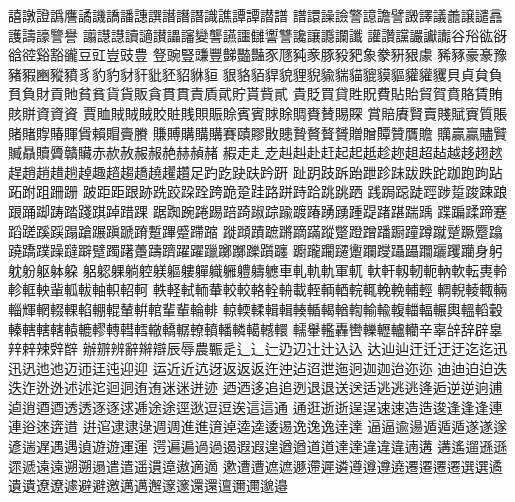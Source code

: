 譆󠄀譈󠄀證󠄀譌󠄀譍󠄀譎󠄀譏󠄀譑󠄀譒󠄀譓󠄀譔󠄀譖󠄀譖󠄁譖󠄂識󠄀譙󠄀譚󠄀譚󠄁譛󠄀譜󠄀
譜󠄁譞󠄀譟󠄀譣󠄀警󠄀譩󠄀譫󠄀譬󠄀譭󠄀譯󠄀議󠄀譱󠄀譲󠄀譴󠄀譶󠄀護󠄀譸󠄀譹󠄀譼󠄀譽󠄀
譾󠄀譿󠄀譿󠄁讀󠄀讁󠄀讃󠄀讄󠄀讅󠄀變󠄀讋󠄀讌󠄀讍󠄀讎󠄀讏󠄀讐󠄀讒󠄀讓󠄀讔󠄀讕󠄀讖󠄀
讙󠄀讚󠄀讜󠄀讝󠄀讞󠄀讟󠄀谷󠄀谸󠄀谹󠄀谺󠄀谽󠄀谾󠄀谿󠄀豁󠄀豅󠄀豆󠄀豇󠄀豈󠄀豉󠄀豊󠄀
豋󠄀豌󠄀豎󠄀豏󠄀豐󠄀豑󠄀豓󠄀豔󠄀豕󠄀豗󠄀豘󠄀豙󠄀豚󠄀豛󠄀豝󠄀象󠄀豢󠄀豣󠄀豤󠄀豦󠄀
豨󠄀豩󠄀豪󠄀豪󠄁豫󠄀豬󠄀豭󠄀豳󠄀豵󠄀豶󠄀豸󠄀豹󠄀豹󠄁豺󠄀豻󠄀豼󠄀豾󠄀貂󠄀貅󠄀貆󠄀
貇󠄀貉󠄀貊󠄀貋󠄀貌󠄀貍󠄀貎󠄀貐󠄀貒󠄀貓󠄀貔󠄀貘󠄀貙󠄀貛󠄀貛󠄁貜󠄀貝󠄀貞󠄀貟󠄀負󠄀
負󠄁負󠄂財󠄀貢󠄀貤󠄀貧󠄀貧󠄁貨󠄀貨󠄁販󠄀貪󠄀貫󠄀貫󠄁責󠄀貭󠄀貮󠄀貯󠄀貰󠄀貲󠄀貳󠄀
貴󠄀貶󠄀買󠄀貸󠄀貹󠄀貺󠄀費󠄀貼󠄀貽󠄀貿󠄀賀󠄀賁󠄀賂󠄀賃󠄀賄󠄀賅󠄀賆󠄀資󠄀資󠄁資󠄂
賈󠄀賉󠄀賊󠄀賊󠄁賊󠄂賋󠄀賍󠄀賎󠄀賏󠄀賑󠄀賒󠄀賓󠄀賓󠄁賕󠄀賖󠄀賙󠄀賚󠄀賛󠄀賜󠄀賝󠄀
賞󠄀賠󠄀賡󠄀賢󠄀賣󠄀賤󠄀賦󠄀賨󠄀質󠄀賬󠄀賭󠄀賭󠄁賯󠄀賰󠄀賱󠄀賲󠄀賴󠄀賵󠄀賷󠄀賸󠄀
賺󠄀賻󠄀購󠄀購󠄁購󠄂賽󠄀賾󠄀賿󠄀贁󠄀贃󠄀贄󠄀贅󠄀贅󠄁贇󠄀贈󠄀贈󠄁贉󠄀贊󠄀贋󠄀贍󠄀
贎󠄀贏󠄀贏󠄁贐󠄀贒󠄀贓󠄀贔󠄀贖󠄀贗󠄀贛󠄀贜󠄀赤󠄀赥󠄀赦󠄀赧󠄀赧󠄁赩󠄀赫󠄀赬󠄀赭󠄀
赮󠄀走󠄀走󠄁赱󠄀赳󠄀赳󠄁赴󠄀赶󠄀起󠄀起󠄁赿󠄀趁󠄀趂󠄀趄󠄀超󠄀趈󠄀越󠄀趍󠄀趐󠄀趑󠄀
趕󠄀趙󠄀趙󠄁趞󠄀趟󠄀趠󠄀趣󠄀趦󠄀趨󠄀趫󠄀趬󠄀趯󠄀趲󠄀足󠄀趵󠄀趷󠄀趹󠄀趺󠄀趻󠄀趼󠄀
趾󠄀跀󠄀跂󠄀跅󠄀跆󠄀跇󠄀跈󠄀跊󠄀跋󠄀跌󠄀跎󠄀跏󠄀跑󠄀跔󠄀跕󠄀跖󠄀跗󠄀跙󠄀跚󠄀跚󠄁
跛󠄀距󠄀距󠄁跟󠄀跡󠄀跣󠄀跤󠄀跥󠄀跧󠄀跨󠄀跪󠄀跫󠄀跬󠄀路󠄀跰󠄀跱󠄀跲󠄀跳󠄀跳󠄁跴󠄀
践󠄀跼󠄀跽󠄀跿󠄀踁󠄀踄󠄀踅󠄀踆󠄀踈󠄀踉󠄀踉󠄁踊󠄀踋󠄀踌󠄀踏󠄀踐󠄀踑󠄀踔󠄀踖󠄀踝󠄀
踞󠄀踟󠄀踠󠄀踡󠄀踢󠄀踣󠄀踦󠄀踧󠄀踪󠄀踰󠄀踱󠄀踳󠄀踴󠄀踴󠄁踵󠄀踶󠄀踷󠄀踸󠄀踹󠄀踽󠄀
蹀󠄀蹁󠄀蹂󠄀蹄󠄀蹇󠄀蹈󠄀蹉󠄀蹊󠄀蹊󠄁蹋󠄀蹌󠄀蹍󠄀蹎󠄀蹏󠄀蹐󠄀蹔󠄀蹕󠄀蹙󠄀蹛󠄀蹜󠄀
蹝󠄀蹞󠄀蹟󠄀蹠󠄀蹡󠄀蹢󠄀蹣󠄀蹤󠄀蹩󠄀蹬󠄀蹭󠄀蹯󠄀蹰󠄀蹱󠄀蹲󠄀蹴󠄀蹵󠄀蹶󠄀蹷󠄀蹹󠄀
蹺󠄀蹻󠄀蹼󠄀躁󠄀躂󠄀躃󠄀躄󠄀躅󠄀躇󠄀躉󠄀躊󠄀躋󠄀躍󠄀躍󠄁躐󠄀躑󠄀躑󠄁躒󠄀躓󠄀躔󠄀
躕󠄀躘󠄀躙󠄀躚󠄀躛󠄀躝󠄀躞󠄀躡󠄀躡󠄁躢󠄀躧󠄀躩󠄀躪󠄀身󠄀躬󠄀躭󠄀躮󠄀躯󠄀躰󠄀躱󠄀
躳󠄀躵󠄀躶󠄀躺󠄀躻󠄀躾󠄀軀󠄀軁󠄀軃󠄀軄󠄀軅󠄀軆󠄀軇󠄀軈󠄀車󠄀軋󠄀軌󠄀軌󠄁軍󠄀軏󠄀
軑󠄀軒󠄀軔󠄀軔󠄁軛󠄀軜󠄀軟󠄀転󠄀軣󠄀軨󠄀軫󠄀軭󠄀軮󠄀軰󠄀軱󠄀軷󠄀軸󠄀軹󠄀軺󠄀軻󠄀
軼󠄀軽󠄀軾󠄀輀󠄀輂󠄀較󠄀較󠄁輅󠄀輇󠄀輈󠄀載󠄀輊󠄀輌󠄀輏󠄀輐󠄀輒󠄀輓󠄀輓󠄁輔󠄀輕󠄀
輖󠄀輗󠄀輘󠄀輙󠄀輛󠄀輜󠄀輝󠄀輞󠄀輟󠄀輠󠄀輡󠄀輣󠄀輥󠄀輦󠄀輧󠄀輨󠄀輩󠄀輩󠄁輪󠄀輫󠄀
輬󠄀輭󠄀輮󠄀輯󠄀輯󠄁輳󠄀輴󠄀輵󠄀輶󠄀輷󠄀輸󠄀輸󠄁輹󠄀輺󠄀輻󠄀輾󠄀輿󠄀轀󠄀轁󠄀轂󠄀
轃󠄀轄󠄀轄󠄁轄󠄂轅󠄀轆󠄀轇󠄀轉󠄀轊󠄀轌󠄀轍󠄀轎󠄀轏󠄀轑󠄀轒󠄀轓󠄀轔󠄀轕󠄀轗󠄀轘󠄀
轜󠄀轝󠄀轞󠄀轟󠄀轡󠄀轢󠄀轣󠄀轤󠄀轥󠄀辛󠄀辜󠄀辝󠄀辞󠄀辟󠄀辠󠄀辡󠄀辢󠄀辣󠄀辤󠄀辥󠄀
辦󠄀辧󠄀辨󠄀辭󠄀辮󠄀辯󠄀辰󠄀辱󠄀農󠄀辴󠄀辵󠄀辶󠄀辶󠄁辷󠄀辸󠄀辺󠄀辻󠄀辻󠄁込󠄀込󠄁
达󠄀辿󠄀辿󠄁迀󠄀迁󠄀迂󠄀迂󠄁迄󠄀迄󠄁迅󠄀迅󠄁迅󠄂迆󠄀迆󠄁迈󠄀迊󠄀迋󠄀迍󠄀迎󠄀迎󠄁
运󠄀近󠄀近󠄁迒󠄀迓󠄀返󠄀返󠄁返󠄂迕󠄀迚󠄀迠󠄀迢󠄀迣󠄀迤󠄀迥󠄀迦󠄀迦󠄁迨󠄀迩󠄀迩󠄁
迪󠄀迪󠄁迫󠄀迫󠄁迭󠄀迭󠄁迮󠄀迯󠄀迯󠄁述󠄀述󠄁迱󠄀迴󠄀迵󠄀迶󠄀迶󠄁迷󠄀迷󠄁迸󠄀迹󠄀
迺󠄀迺󠄁迻󠄀追󠄀追󠄁迾󠄀退󠄀退󠄁送󠄀送󠄁适󠄀逃󠄀逃󠄁逃󠄂逄󠄀逅󠄀逆󠄀逆󠄁逈󠄀逋󠄀
逌󠄀逍󠄀逎󠄀逎󠄁透󠄀透󠄁逐󠄀逐󠄁逑󠄀逓󠄀途󠄀途󠄁逕󠄀逖󠄀逗󠄀逗󠄁逘󠄀這󠄀這󠄁通󠄀
通󠄁逛󠄀逝󠄀逝󠄁逞󠄀逞󠄁速󠄀速󠄁造󠄀造󠄁逡󠄀逢󠄀逢󠄁逢󠄂連󠄀連󠄁逧󠄀逨󠄀逩󠄀逪󠄀
逬󠄀逭󠄀逮󠄀逮󠄁逯󠄀週󠄀週󠄁進󠄀進󠄁逳󠄀逴󠄀逵󠄀逵󠄁逶󠄀逷󠄀逸󠄀逸󠄁逸󠄂逹󠄀逹󠄁
逼󠄀逼󠄁逾󠄀逿󠄀遁󠄀遁󠄁遁󠄂遂󠄀遂󠄁遂󠄂遃󠄀遄󠄀遅󠄀遇󠄀遇󠄁遉󠄀遊󠄀遊󠄁運󠄀運󠄁
遌󠄀遍󠄀遍󠄁過󠄀過󠄁遏󠄀遐󠄀遐󠄁遑󠄀遒󠄀遒󠄁道󠄀道󠄁達󠄀達󠄁違󠄀違󠄁違󠄂遖󠄀遘󠄀
遘󠄁遙󠄀遛󠄀遜󠄀遜󠄁遝󠄀遞󠄀遠󠄀遠󠄁遡󠄀遡󠄁遢󠄀遣󠄀遣󠄁遥󠄀遦󠄀遧󠄀遨󠄀適󠄀適󠄁
遬󠄀遭󠄀遭󠄁遮󠄀遮󠄁遯󠄀遰󠄀遲󠄀遴󠄀遵󠄀遵󠄁遵󠄂遶󠄀遷󠄀遷󠄁遷󠄂遷󠄃選󠄀選󠄁遹󠄀
遺󠄀遺󠄁遼󠄀遼󠄁遽󠄀避󠄀避󠄁邀󠄀邁󠄀邁󠄁邂󠄀邃󠄀邃󠄁還󠄀還󠄁邅󠄀邇󠄀邇󠄁邈󠄀邉󠄀

